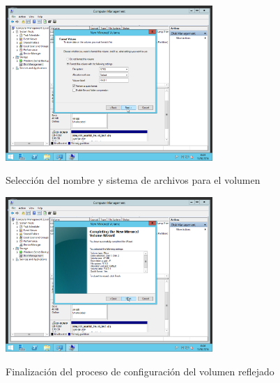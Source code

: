 \begin{figure}[H]
	\begin{center}
		\includegraphics[width=0.7\textwidth]{Imagenes/07_Nombre-del-volumen-y-sistema-de-archivos-final.png}
		\caption{Selección del nombre y sistema de archivos para el volumen} \label{fig:figura17}
		\includegraphics[width=0.7\textwidth]{Imagenes/08_Finalizacion-del-proceso}
		\caption{Finalización del proceso de configuración del volumen reflejado} \label{fig:figura18}
	\end{center}
\end{figure}

